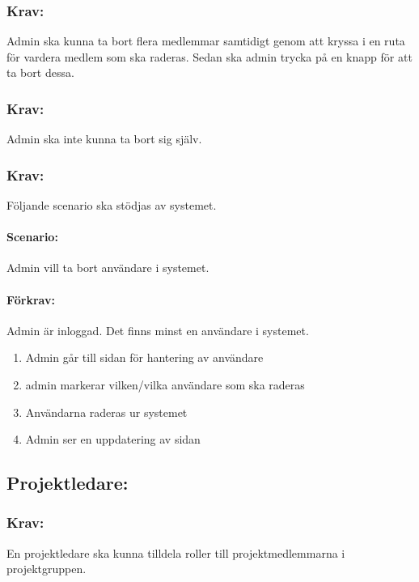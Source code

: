 \documentclass[paper=a4, fontsize=11pt,twoside]{article}
\begin{document}
\subsubsection{Krav:} Admin ska kunna ta bort flera medlemmar samtidigt genom att kryssa i en ruta för vardera medlem som ska raderas. Sedan ska admin trycka på en knapp för att ta bort dessa.

\subsubsection{Krav:} Admin ska inte kunna ta bort sig själv.

\subsubsection{Krav:} Följande scenario ska stödjas av systemet. 
\paragraph{Scenario:}
Admin vill ta bort användare i systemet.
\paragraph{Förkrav:}
Admin är inloggad. Det finns minst en användare i systemet.
\begin{enumerate}
\item Admin går till sidan för hantering av användare
\item admin markerar vilken/vilka användare som ska raderas
\item Användarna raderas ur systemet
\item Admin ser en uppdatering av sidan
\end{enumerate}


\subsection{Projektledare:}

\subsubsection{Krav:} En projektledare ska kunna tilldela roller till projektmedlemmarna i projektgruppen.
\end{document}
